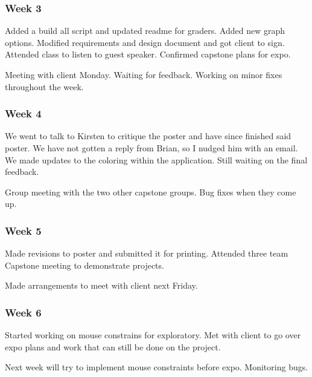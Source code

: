 \subsubsection{Week 3}
Added a build all script and updated readme for graders. Added new graph options. Modified requirements and design document and got client to sign. Attended class to listen to guest speaker. Confirmed capstone plans for expo.

Meeting with client Monday. Waiting for feedback. Working on minor fixes throughout the week.

\subsubsection{Week 4}
We went to talk to Kirsten to critique the poster and have since finished said poster. We have not gotten a reply from Brian, so I nudged him with an email. We made updates to the coloring within the application. Still waiting on the final feedback.

Group meeting with the two other capstone groups. Bug fixes when they come up. 

\subsubsection{Week 5}
Made revisions to poster and submitted it for printing. Attended three team Capstone meeting to demonstrate projects. 

Made arrangements to meet with client next Friday.

\subsubsection{Week 6}
Started working on mouse constrains for exploratory. Met with client to go over expo plans and work that can still be done on the project.

Next week will try to implement mouse constraints before expo. Monitoring bugs. 